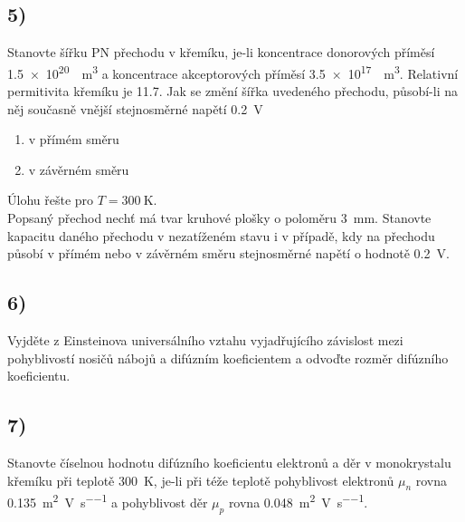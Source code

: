 \newpage


\subsection*{5)}

Stanovte šířku PN přechodu v křemíku, je-li koncentrace donorových příměsí \SI{1,5e20}{\per\cubic\meter} a koncentrace akceptorových příměsí \SI{3,5e17}{\per\cubic\meter}. Relativní permitivita křemíku je \SI{11,7}{}. Jak se změní šířka uvedeného přechodu, působí-li na něj současně vnější stejnosměrné napětí \SI{0,2}{\volt} 
\begin{enumerate}[label=\alph*)]
    \item v přímém směru
    \item v závěrném směru
\end{enumerate}
Úlohu řešte pro $T=\SI{300}{\kelvin}$. \\
Popsaný přechod nechť má tvar kruhové plošky o poloměru \SI{3}{\milli\meter}. Stanovte kapacitu daného přechodu v nezatíženém stavu i v případě, kdy na přechodu působí v přímém nebo v závěrném směru stejnosměrné napětí o hodnotě \SI{0,2}{\volt}.

\newpage


\subsection*{6)}

Vyjděte z Einsteinova universálního vztahu vyjadřujícího závislost mezi pohyblivostí nosičů nábojů a difúzním koeficientem a odvoďte rozměr difúzního koeficientu.

\newpage


\subsection*{7)}

Stanovte číselnou hodnotu difúzního koeficientu elektronů a děr v monokrystalu křemíku při teplotě \SI{300}{\kelvin}, je-li při téže teplotě pohyblivost elektronů $\mu_n$ rovna \SI{0,135}{\meter\squared\per\volt\per\second} a pohyblivost děr $\mu_p$ rovna \SI{0,048}{\meter\squared\per\volt\per\second}.

